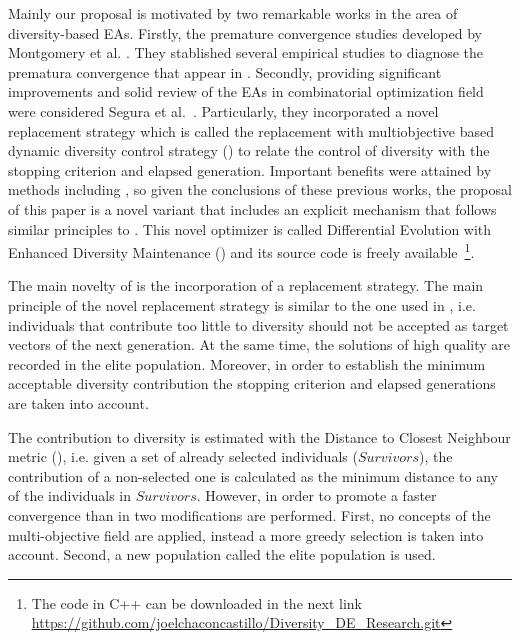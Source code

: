 Mainly our proposal is motivated by two remarkable works in the area of diversity-based EAs.
%
Firstly, the premature convergence studies developed by Montgomery et al. \cite{montgomery2012simple}.
%
They stablished several empirical studies to diagnose the prematura convergence that appear in \DE{}.
%
Secondly, providing significant improvements and solid review of the EAs in combinatorial optimization field were considered Segura et al.~\cite{segura2016novel}.
%
Particularly, they incorporated a novel replacement strategy which is called the replacement with multiobjective based dynamic diversity control strategy (\RMDDC{}) to relate the control of diversity with the stopping criterion and elapsed generation.
%
Important benefits were attained by methods including \RMDDC{}, so given the conclusions of these previous works, the proposal of this paper is a 
novel \DE{} variant that includes an explicit mechanism that follows similar principles to \RMDDC{}.
%
This novel optimizer is called Differential Evolution with Enhanced Diversity Maintenance (\DEEDM{}) and its source
code is freely available~\footnote{The code in C++ can be downloaded in the next link \url{https://github.com/joelchaconcastillo/Diversity\_DE\_Research.git}}.

The main novelty of \DEEDM{} is the incorporation of a replacement strategy.
%
The main principle of the novel replacement strategy is similar to the one used in \RMDDC{}, i.e.
individuals that contribute too little to diversity should not be accepted as target vectors of the next generation.
%
At the same time, the solutions of high quality are recorded in the elite population.
%
Moreover, in order to establish the minimum acceptable diversity contribution the stopping criterion and elapsed
generations are taken into account.

The contribution to diversity is estimated with the Distance to Closest Neighbour metric (\DCN{}), i.e. given
a set of already selected individuals ($Survivors$), the contribution of a non-selected one is calculated as the minimum
distance to any of the individuals in $Survivors$.
%
However, in order to promote a faster convergence than in \RMDDC{} two modifications are performed.
%
First, no concepts of the multi-objective field are applied, instead a more greedy selection is taken into account.
%
Second, a new population called the elite population is used.

